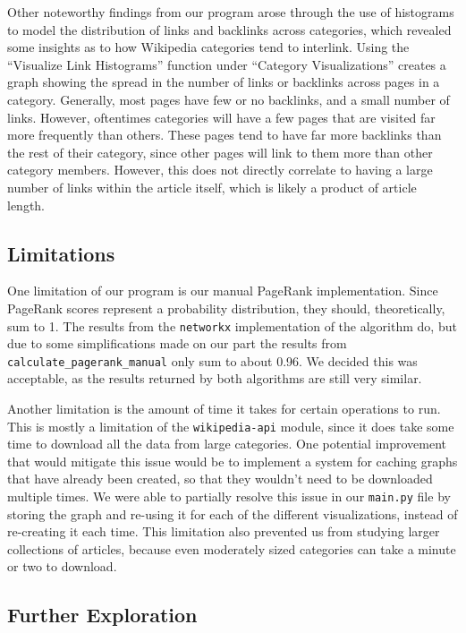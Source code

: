 \documentclass[fontsize=11pt]{article}
\begin{document}
Other noteworthy findings from our program arose through the use of histograms to model the distribution of links and backlinks across categories, which revealed some insights as to how Wikipedia categories tend to interlink. Using the ``Visualize Link Histograms'' function under ``Category Visualizations'' creates a graph showing the spread in the number of links or backlinks across pages in a category. Generally, most pages have few or no backlinks, and a small number of links. However, oftentimes categories will have a few pages that are visited far more frequently than others. These pages tend to have far more backlinks than the rest of their category, since other pages will link to them more than other category members. However, this does not directly correlate to having a large number of links within the article itself, which is likely a product of article length.

\subsection{Limitations}
One limitation of our program is our manual PageRank implementation. Since PageRank scores represent a probability distribution, they should, theoretically, sum to 1. The results from the \texttt{networkx} implementation of the algorithm do, but due to some simplifications made on our part the results from \texttt{calculate\_pagerank\_manual} only sum to about 0.96. We decided this was acceptable, as the results returned by both algorithms are still very similar.

Another limitation is the amount of time it takes for certain operations to run. This is mostly a limitation of the \texttt{wikipedia-api} module, since it does take some time to download all the data from large categories. One potential improvement that would mitigate this issue would be to implement a system for caching graphs that have already been created, so that they wouldn't need to be downloaded multiple times. We were able to partially resolve this issue in our \texttt{main.py} file by storing the graph and re-using it for each of the different visualizations, instead of re-creating it each time. This limitation also prevented us from studying larger collections of articles, because even moderately sized categories can take a minute or two to download.

\subsection{Further Exploration}
\end{document}
